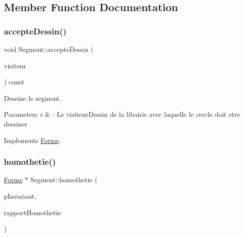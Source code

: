 \subsection{Member Function Documentation}
\mbox{\label{class_segment_ab9106868b99c5238e1b46c0e86280913}} 
\subsubsection{\texorpdfstring{accepteDessin()}{accepteDessin()}}
{\footnotesize\ttfamily void Segment\+::accepte\+Dessin (\begin{DoxyParamCaption}\item[{\mbox{\hyperlink{class_visitor_dessiner_forme}{Visitor\+Dessiner\+Forme}} $\ast$}]{visiteur }\end{DoxyParamCaption}) const\hspace{0.3cm}{\ttfamily [virtual]}}



Dessine le segment. 


\begin{DoxyParams}{Parameters}
{\em v} & \+: Le visiteur\+Dessin de la libairie avec laquelle le cercle doit etre dessiner \\
\hline
\end{DoxyParams}


Implements \mbox{\hyperlink{class_forme}{Forme}}.

\mbox{\label{class_segment_ac1bcee908f7c0a051fc72efa9e3e4b57}} 
\subsubsection{\texorpdfstring{homothetie()}{homothetie()}}
{\footnotesize\ttfamily \mbox{\hyperlink{class_forme}{Forme}} $\ast$ Segment\+::homothetie (\begin{DoxyParamCaption}\item[{const \mbox{\hyperlink{class_vecteur2_d}{Vecteur2D}} \&}]{p\+Invariant,  }\item[{const double \&}]{rapport\+Homothetie }\end{DoxyParamCaption})\hspace{0.3cm}{\ttfamily [virtual]}}



